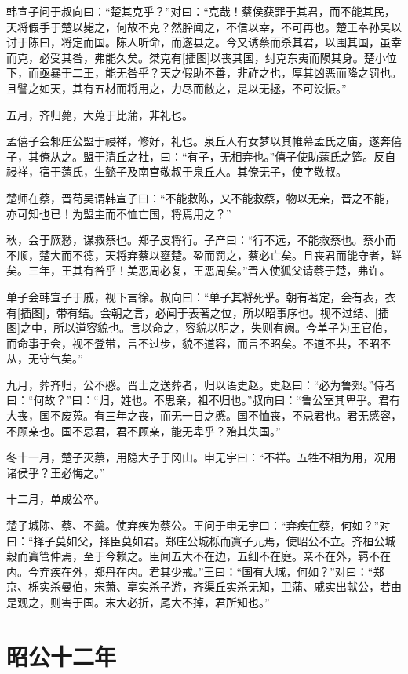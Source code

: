 \documentclass[a4paper,12pt,UTF8,twoside]{ctexbook}
\begin{document}
韩宣子问于叔向曰：“楚其克乎？”对曰：“克哉！蔡侯获罪于其君，而不能其民，天将假手于楚以毙之，何故不克？然肸闻之，不信以幸，不可再也。楚王奉孙吴以讨于陈曰，将定而国。陈人听命，而遂县之。今又诱蔡而杀其君，以围其国，虽幸而克，必受其咎，弗能久矣。桀克有[插图]以丧其国，纣克东夷而陨其身。楚小位下，而亟暴于二王，能无咎乎？天之假助不善，非祚之也，厚其凶恶而降之罚也。且譬之如天，其有五材而将用之，力尽而敝之，是以无拯，不可没振。”

五月，齐归薨，大蒐于比蒲，非礼也。

孟僖子会邾庄公盟于祲祥，修好，礼也。泉丘人有女梦以其帷幕孟氏之庙，遂奔僖子，其僚从之。盟于清丘之社，曰：“有子，无相弃也。”僖子使助薳氏之簉。反自祲祥，宿于薳氏，生懿子及南宫敬叔于泉丘人。其僚无子，使字敬叔。

楚师在蔡，晋荀吴谓韩宣子曰：“不能救陈，又不能救蔡，物以无亲，晋之不能，亦可知也已！为盟主而不恤亡国，将焉用之？”

秋，会于厥慭，谋救蔡也。郑子皮将行。子产曰：“行不远，不能救蔡也。蔡小而不顺，楚大而不德，天将弃蔡以壅楚。盈而罚之，蔡必亡矣。且丧君而能守者，鲜矣。三年，王其有咎乎！美恶周必复，王恶周矣。”晋人使狐父请蔡于楚，弗许。

单子会韩宣子于戚，视下言徐。叔向曰：“单子其将死乎。朝有著定，会有表，衣有[插图]，带有结。会朝之言，必闻于表著之位，所以昭事序也。视不过结、[插图]之中，所以道容貌也。言以命之，容貌以明之，失则有阙。今单子为王官伯，而命事于会，视不登带，言不过步，貌不道容，而言不昭矣。不道不共，不昭不从，无守气矣。”

九月，葬齐归，公不慼。晋士之送葬者，归以语史赵。史赵曰：“必为鲁郊。”侍者曰：“何故？”曰：“归，姓也。不思亲，祖不归也。”叔向曰：“鲁公室其卑乎。君有大丧，国不废蒐。有三年之丧，而无一日之慼。国不恤丧，不忌君也。君无慼容，不顾亲也。国不忌君，君不顾亲，能无卑乎？殆其失国。”

冬十一月，楚子灭蔡，用隐大子于冈山。申无宇曰：“不祥。五牲不相为用，况用诸侯乎？王必悔之。”

十二月，单成公卒。

楚子城陈、蔡、不羹。使弃疾为蔡公。王问于申无宇曰：“弃疾在蔡，何如？”对曰：“择子莫如父，择臣莫如君。郑庄公城栎而寘子元焉，使昭公不立。齐桓公城穀而寘管仲焉，至于今赖之。臣闻五大不在边，五细不在庭。亲不在外，羁不在内。今弃疾在外，郑丹在内。君其少戒。”王曰：“国有大城，何如？”对曰：“郑京、栎实杀曼伯，宋萧、亳实杀子游，齐渠丘实杀无知，卫蒲、戚实出献公，若由是观之，则害于国。末大必折，尾大不掉，君所知也。”


\section{昭公十二年}
\end{document}
